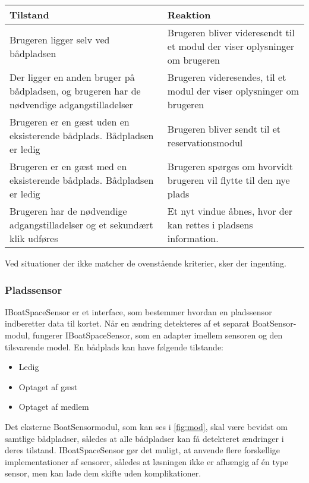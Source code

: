 \begin{tabu} to \textwidth {XX}
  \toprule
  \textbf{Tilstand} & \textbf{Reaktion} \\
   \midrule
   Brugeren ligger selv ved bådpladsen & Brugeren bliver videresendt til et modul der viser oplysninger om brugeren \\
   \midrule
  Der ligger en anden bruger på bådpladsen, og brugeren har de nødvendige adgangstilladelser & Brugeren videresendes, til et modul der viser oplysninger om brugeren \\
  \midrule
   Brugeren er en gæst uden en eksisterende bådplads. Bådpladsen er ledig & Brugeren bliver sendt til et reservationsmodul \\ 
   \midrule
   Brugeren er en gæst med en eksisterende bådplads. Bådpladsen er ledig & Brugeren spørges om hvorvidt brugeren vil flytte til den nye plads \\
   \midrule
   Brugeren har de nødvendige adgangstilladelser og et sekundært klik udføres & Et nyt vindue åbnes, hvor der kan rettes i pladsens information. \\
   \bottomrule 
\end{tabu}


Ved situationer der ikke matcher de ovenstående kriterier, sker der ingenting.


\subsubsection{Pladssensor}
\label{sub:map_sensor_interface}

IBoatSpaceSensor er et interface, som bestemmer hvordan en pladssensor indberetter data til kortet. Når en ændring detekteres af et separat BoatSensor-modul, fungerer IBoatSpaceSensor, som en adapter imellem sensoren og den tilsvarende model. En bådplads kan have følgende tilstande:

\begin{itemize}
  \item Ledig
  \item Optaget af gæst
  \item Optaget af medlem
\end{itemize}

Det eksterne BoatSensormodul, som kan ses i \cref{fig:mod}, skal være bevidst om samtlige bådpladser, således at alle bådpladser kan få detekteret ændringer i deres tilstand. IBoatSpaceSensor gør det muligt, at anvende flere forskellige implementationer af sensorer, således at løsningen ikke er afhængig af én type sensor, men kan lade dem skifte uden komplikationer.



